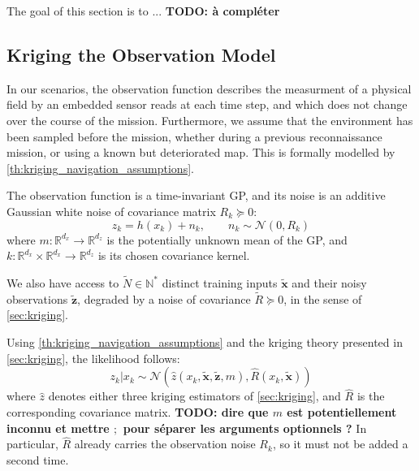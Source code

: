 The goal of this section is to ... \textbf{TODO: à compléter}

\subsection{Kriging the Observation Model}

In our scenarios, the observation function describes the measurment of a physical field by an embedded sensor reads at each time step, and which does not change over the course of the mission. Furthermore, we assume that the environment has been sampled before the mission, whether during a previous reconnaissance mission, or using a known but deteriorated map. This is formally modelled by \cref{th:kriging_navigation_assumptions}.

\begin{assumption}\label{th:kriging_navigation_assumptions}
	The observation function is a time-invariant GP, and its noise is an additive Gaussian white noise of covariance matrix $R_k\succeq0$:
	\begin{equation}
		z_k=h(x_k)+n_k,\qquad n_k\sim\mathcal{N}(0,R_k)\label{eq:field_observation}
	\end{equation}
	where $m:\mathbb{R}^{d_x}\to\mathbb{R}^{d_z}$ is the potentially unknown mean of the GP, and $k:\mathbb{R}^{d_x}\times\mathbb{R}^{d_x}\to\mathbb{R}^{d_z}$ is its chosen covariance kernel.

	We also have access to $\tilde{N}\in\mathbb{N}^*$ distinct training inputs $\tilde{\mathbf{x}}$ and their noisy observations $\tilde{\mathbf{z}}$, degraded by a noise of covariance $\tilde{R}\succeq0$, in the sense of \cref{sec:kriging}.
\end{assumption}

Using \cref{th:kriging_navigation_assumptions} and the kriging theory presented in \cref{sec:kriging}, the likelihood follows:
\begin{equation}
	z_k|x_k\sim\mathcal{N}\left(\hat{z}(x_k,\tilde{\mathbf{x}},\tilde{\mathbf{z}},m),\hat{R}(x_k,\tilde{\mathbf{x}})\right)\label{eq:kriged_likelihood}
\end{equation}
where $\hat{z}$ denotes either three kriging estimators of \cref{sec:kriging}, and $\hat{R}$ is the corresponding covariance matrix. \textbf{TODO: dire que $m$ est potentiellement inconnu et mettre $;$ pour séparer les arguments optionnels ?} In particular, $\hat{R}$ already carries the observation noise $R_k$, so it must not be added a second time.

